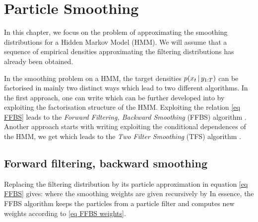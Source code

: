 
\section{Particle Smoothing}

In this chapter, we focus on the problem of approximating the smoothing distributions for a Hidden Markov Model (HMM). We will assume that a sequence of empirical densities approximating the filtering distributions has already been obtained.

In the smoothing problem on a HMM, the target densities $p(x_t\,|\, y_{1:T})$ can be factorised in mainly two distinct ways which lead to two different algorithms. In the first approach, one can write 
 which can be further developed into
by exploiting the factorisation structure of the HMM. Exploiting the relation \eqref{eq FFBS} leads to the \emph{Forward Filtering, Backward Smoothing} (FFBS) algorithm \citep{hurzeler98, doucet00}. Another approach starts with writing 
exploiting the conditional dependences of the HMM, we get
which leads to the \emph{Two Filter Smoothing} (TFS) algorithm \citep{kitagawa96}.

\subsection{Forward filtering, backward smoothing}
Replacing the filtering distribution by its particle approximation in equation \eqref{eq FFBS} gives:
where the smoothing weights are given recursively by
In essence, the FFBS algorithm keeps the particles from a particle filter and computes new weights according to \eqref{eq FFBS weights}. 

